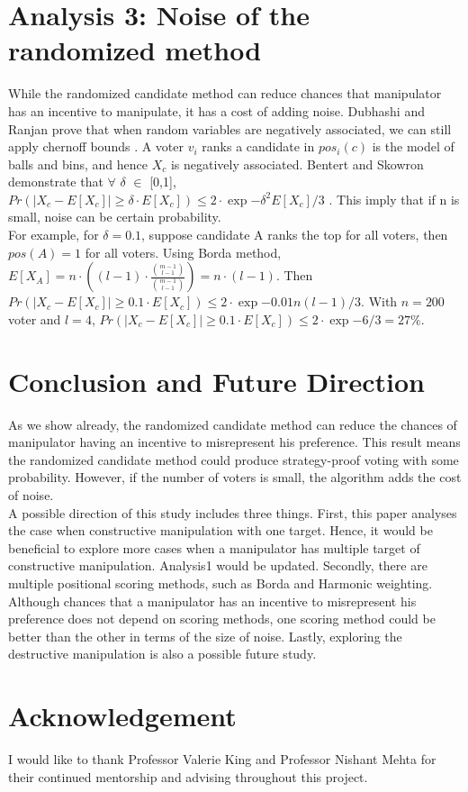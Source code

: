 \documentclass[letterpaper]{article} %
\begin{document}
\section{Analysis 3: Noise of the randomized method}
While the randomized candidate method can reduce chances that manipulator has an incentive to manipulate, it has a cost of adding noise. Dubhashi and Ranjan prove that when random variables are negatively associated, we can still apply chernoff bounds \cite{BRICS}. A voter $v_i$ ranks a candidate in $pos_i(c)$ is the model of balls and bins, and hence $X_c$ is negatively associated. Bentert and Skowron demonstrate that $\forall$ $\delta$ $\in$ [0,1], $Pr(|X_c-E[X_c]| \geq \delta\cdot E[X_c]) \leq 2\cdot\exp{-\delta^2E[X_c]/3} $ \cite{Skowron}. This imply that if n is small, noise can be certain probability. \\
For example, for $\delta = 0.1$,  suppose candidate A ranks the top for all voters, then $pos(A) = 1$ for all voters. Using Borda method, $E[X_A]=n\cdot((l-1)\cdot \frac{\binom{m-1}{l-1}}{\binom{m-1}{l-1}}) = n\cdot(l-1).$ Then $Pr(|X_c-E[X_c]| \geq 0.1\cdot E[X_c]) \leq 2\cdot\exp{-0.01n(l-1)/3} $.
With $n=200$ voter and $l=4$, $Pr(|X_c-E[X_c]| \geq 0.1\cdot E[X_c]) \leq 2\cdot\exp{-6/3} = 27\%$.


\section{Conclusion and Future Direction}
As we show already, the randomized candidate method can reduce the chances of manipulator having an incentive to misrepresent his preference. This result means the randomized candidate method could produce strategy-proof voting with some probability. However, if the number of voters is small, the algorithm adds the cost of noise.\\
A possible direction of this study includes three things. First, this paper analyses the case when constructive manipulation with one target. Hence, it would be beneficial to explore more cases when a manipulator has multiple target of constructive manipulation. Analysis1 would be updated.
Secondly, there are multiple positional scoring methods, such as Borda and Harmonic weighting. Although chances that a manipulator has an incentive to misrepresent his preference does not depend on scoring methods, one scoring method could be better than the other in terms of the size of noise. Lastly, exploring the destructive manipulation is also a possible future study.


\section{Acknowledgement}
I would like to thank Professor Valerie King and Professor Nishant Mehta for their continued mentorship and advising throughout this project.




\end{document}
